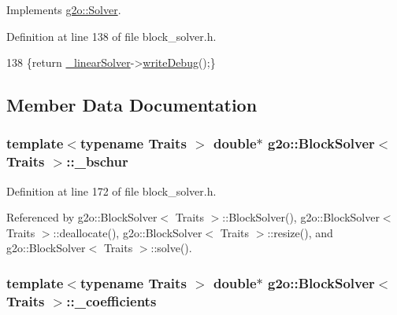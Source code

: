 Implements \hyperlink{classg2o_1_1Solver_a0f6f14940eccea0f9bf9e2ea144c9b4d}{g2o\+::\+Solver}.



Definition at line 138 of file block\+\_\+solver.\+h.


\begin{DoxyCode}
138 \{\textcolor{keywordflow}{return} \hyperlink{classg2o_1_1BlockSolver_a676a4ef473ccaecb23050284e19659af}{\_linearSolver}->\hyperlink{classg2o_1_1LinearSolver_a8b6a84bd88f1bbc13d2c80c3a14d4693}{writeDebug}();\}
\end{DoxyCode}


\subsection{Member Data Documentation}
\subsubsection[{\texorpdfstring{\+\_\+bschur}{_bschur}}]{\setlength{\rightskip}{0pt plus 5cm}template$<$typename Traits $>$ double$\ast$ {\bf g2o\+::\+Block\+Solver}$<$ Traits $>$\+::\+\_\+bschur\hspace{0.3cm}{\ttfamily [protected]}}\hypertarget{classg2o_1_1BlockSolver_aafddeb1d0a4218fc9c3c77169e20f81a}{}\label{classg2o_1_1BlockSolver_aafddeb1d0a4218fc9c3c77169e20f81a}


Definition at line 172 of file block\+\_\+solver.\+h.



Referenced by g2o\+::\+Block\+Solver$<$ Traits $>$\+::\+Block\+Solver(), g2o\+::\+Block\+Solver$<$ Traits $>$\+::deallocate(), g2o\+::\+Block\+Solver$<$ Traits $>$\+::resize(), and g2o\+::\+Block\+Solver$<$ Traits $>$\+::solve().

\subsubsection[{\texorpdfstring{\+\_\+coefficients}{_coefficients}}]{\setlength{\rightskip}{0pt plus 5cm}template$<$typename Traits $>$ double$\ast$ {\bf g2o\+::\+Block\+Solver}$<$ Traits $>$\+::\+\_\+coefficients\hspace{0.3cm}{\ttfamily [protected]}}\hypertarget{classg2o_1_1BlockSolver_a416f480d4b27d7f8962ae7ae363f2e32}{}\label{classg2o_1_1BlockSolver_a416f480d4b27d7f8962ae7ae363f2e32}


